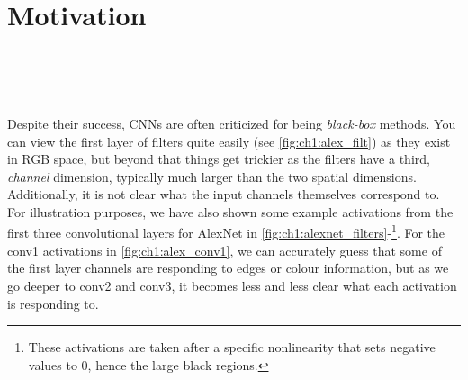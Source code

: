 \section{Motivation}\label{sec:ch1:motivation}
\begin{figure}
  \centering
  \\
  \\
  \\
  \label{fig:ch1:alexnet_filters}
\end{figure}

Despite their success, CNNs are often criticized for being \emph{black-box}
methods. You can view the first layer of filters
quite easily (see \autoref{fig:ch1:alex_filt}) as they exist in RGB
space, but beyond that things get trickier as the filters have a third, \emph{channel}
dimension, typically much larger than the two spatial dimensions. Additionally,
it is not clear what the input channels themselves correspond to. For illustration
purposes, we have also shown some example activations from the first three
convolutional layers for AlexNet in
\autoref{fig:ch1:alexnet_filters}-\footnote{These activations are
taken after a specific nonlinearity that sets negative values to 0, hence the
large black regions.}. For the conv1 activations in
\autoref{fig:ch1:alex_conv1}, we can accurately guess that some of the first layer
channels are responding to edges or colour information, but as we go deeper to
conv2 and conv3, it becomes less and less clear what each activation is
responding to.

